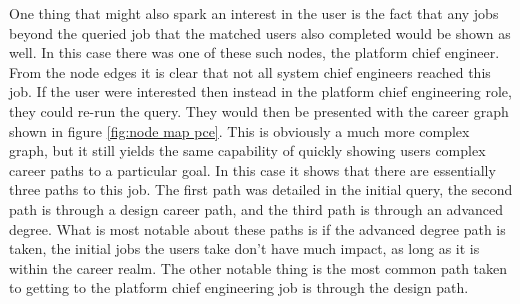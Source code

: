 One thing that might also spark an interest in the user is the fact that any
jobs beyond the queried job that the matched users also completed would be shown
as well.  In this case there was one of these such nodes, the platform chief
engineer.  From the node edges it is clear that not all system chief
engineers reached this job.  If the user were interested then instead in the
platform chief engineering role, they could re-run the query.  They would then
be presented with the career graph shown in figure \ref{fig:node map pce}.  This
is obviously a much more complex graph, but it still yields the same capability
of quickly showing users complex career paths to a particular goal.  In this
case it shows that there are essentially three paths to this job.  The first
path was detailed in the initial query, the second path is through a design
career path, and the third path is through an advanced degree.  What is most
notable about these paths is if the advanced degree path is taken, the initial
jobs the users take don't have much impact, as long as it is within the career realm.
The other notable thing is the most common path taken to getting to the platform
chief engineering job is through the design path.


\usetikzlibrary{shapes,arrows,chains}

